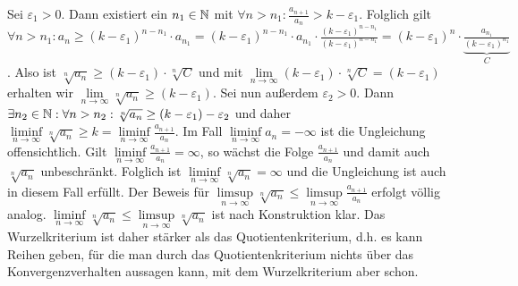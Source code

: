 \documentclass{article}
\newcommand{\mylim}{\lim\limits_{n\to \infty}}
\renewcommand{\epsilon}{\varepsilon}
\begin{document}
\begin{enumerate}[(a)]
		Sei $\epsilon_1 > 0$. Dann existiert ein $n_1\in \mathbb{N}$ mit $\forall n > n_1: \frac{a_{n+1}}{a_n} > k -\epsilon_1$.
		Folglich gilt $\forall n > n_1: a_n \geq (k-\epsilon_1)^{n - n_1}\cdot a_{n_1} = (k-\epsilon_1)^{n - n_1}\cdot a_{n_1} \cdot\frac{(k-\epsilon_1)^{n-n_1}}{(k-\epsilon_1)^{n-n_1}} = (k-\epsilon_1)^n \cdot \underbrace{\frac{a_{n_1}}{(k-\epsilon_1)^{n_1}}}_{C}$.
		Also ist $\sqrt[n]{a_n} \geq (k-\epsilon_1)\cdot \sqrt[n]{C}$ und mit $\mylim (k-\epsilon_1)\cdot \sqrt[n]{C} = (k-\epsilon_1)$ erhalten wir $\mylim \sqrt[n]{a_n} \geq (k-\epsilon_1)$.
		Sei nun außerdem $\epsilon_2 > 0$. Dann $\exists n_2 \in \N: \forall n > n_2: \sqrt[n]{a_n} \geq (k-\epsilon_1)-\epsilon_2$ und daher $\liminf\limits_{n\to \infty} \sqrt[n]{a_n} \geq k = \liminf\limits_{n\to \infty} \frac{a_{n+1}}{a_n}$. Im Fall $\liminf\limits_{n\to \infty} a_n = -\infty$ ist die Ungleichung offensichtlich. Gilt $\liminf\limits_{n\to \infty} \frac{a_{n+1}}{a_n}= \infty$, so wächst die Folge $\frac{a_{n+1}}{a_n}$ und damit auch $\sqrt[n]{a_n}$ unbeschränkt. Folglich ist $\liminf\limits_{n\to \infty} \sqrt[n]{a_n} = \infty$ und die Ungleichung ist auch in diesem Fall erfüllt.
		Der Beweis für $\limsup\limits_{n\to \infty} \sqrt[n]{a_n} \leq \limsup\limits_{n\to \infty} \frac{a_{n+1}}{a_n}$ erfolgt völlig analog. $\liminf\limits_{n\to \infty} \sqrt[n]{a_n} \leq \limsup\limits_{n\to \infty} \sqrt[n]{a_n}$ ist nach Konstruktion klar.
		Das Wurzelkriterium ist daher stärker als das Quotientenkriterium, d.h. es kann Reihen geben, für die man durch das Quotientenkriterium nichts über das Konvergenzverhalten aussagen kann, mit dem Wurzelkriterium aber schon.
	\end{enumerate}
\end{document}
